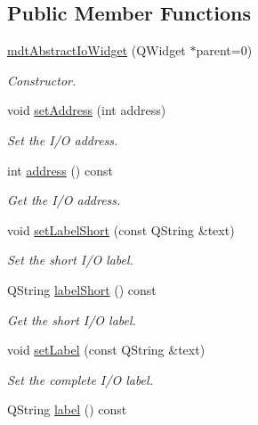 \subsection*{Public Member Functions}
\begin{DoxyCompactItemize}
\item 
\hyperlink{classmdt_abstract_io_widget_a43208dbc9b2948561f5840bcd8fb9128}{mdtAbstractIoWidget} (QWidget $\ast$parent=0)
\begin{DoxyCompactList}\small\item\em Constructor. \end{DoxyCompactList}\item 
\hypertarget{classmdt_abstract_io_widget_a1cdc1763633570e96877a12afad19975}{
void \hyperlink{classmdt_abstract_io_widget_a1cdc1763633570e96877a12afad19975}{setAddress} (int address)}
\label{classmdt_abstract_io_widget_a1cdc1763633570e96877a12afad19975}

\begin{DoxyCompactList}\small\item\em Set the I/O address. \end{DoxyCompactList}\item 
\hypertarget{classmdt_abstract_io_widget_a29737106ab9313f1ab5c49c7684bc74a}{
int \hyperlink{classmdt_abstract_io_widget_a29737106ab9313f1ab5c49c7684bc74a}{address} () const }
\label{classmdt_abstract_io_widget_a29737106ab9313f1ab5c49c7684bc74a}

\begin{DoxyCompactList}\small\item\em Get the I/O address. \end{DoxyCompactList}\item 
void \hyperlink{classmdt_abstract_io_widget_a7517c82a953604985cb502a2e852f716}{setLabelShort} (const QString \&text)
\begin{DoxyCompactList}\small\item\em Set the short I/O label. \end{DoxyCompactList}\item 
\hypertarget{classmdt_abstract_io_widget_a4c89738e31de7d90ff8964c58d728199}{
QString \hyperlink{classmdt_abstract_io_widget_a4c89738e31de7d90ff8964c58d728199}{labelShort} () const }
\label{classmdt_abstract_io_widget_a4c89738e31de7d90ff8964c58d728199}

\begin{DoxyCompactList}\small\item\em Get the short I/O label. \end{DoxyCompactList}\item 
void \hyperlink{classmdt_abstract_io_widget_a4a948cb01e543cdddea7277b9ead7e02}{setLabel} (const QString \&text)
\begin{DoxyCompactList}\small\item\em Set the complete I/O label. \end{DoxyCompactList}\item 
\hypertarget{classmdt_abstract_io_widget_aa9415778f32850c4ad712ef916bd49ca}{
QString \hyperlink{classmdt_abstract_io_widget_aa9415778f32850c4ad712ef916bd49ca}{label} () const }
\label{classmdt_abstract_io_widget_aa9415778f32850c4ad712ef916bd49ca}


\end{DoxyCompactItemize}
